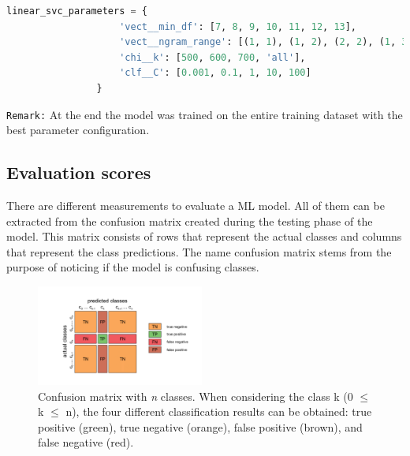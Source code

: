 \begin{lstlisting}[language=Python, caption=Tuned hyperparameters of the linearSVC fitting algorithm, label=codelinearsvcparameters]
linear_svc_parameters = {
                    'vect__min_df': [7, 8, 9, 10, 11, 12, 13],
                    'vect__ngram_range': [(1, 1), (1, 2), (2, 2), (1, 3)],
                    'chi__k': [500, 600, 700, 'all'],
                    'clf__C': [0.001, 0.1, 1, 10, 100]
                }
\end{lstlisting}

\texttt{Remark:} At the end the model was trained on the entire training dataset with the best parameter configuration.\\

\subsection{Evaluation scores} \label{ml_evaluation_scores}
There are different measurements to evaluate a ML model. All of them can be extracted from the confusion matrix created during the testing phase of the model. This matrix consists of rows that represent the actual classes and columns that represent the class predictions. The name confusion matrix stems from the purpose of noticing if the model is confusing classes.

\begin{figure} %
    \centerline{\includegraphics[trim={0 0 0 0},clip,width=0.49\textwidth]{img/Confusion_matrix_edited}}
  \caption{Confusion matrix with \textit{n} classes. When considering the class k (0 $\le$ k $\le$ n), the four different classification results can be obtained: true positive (green), true negative (orange), false positive (brown), and false negative (red).}
  \label{fig:confusion_matrix_illustration}
\end{figure}

